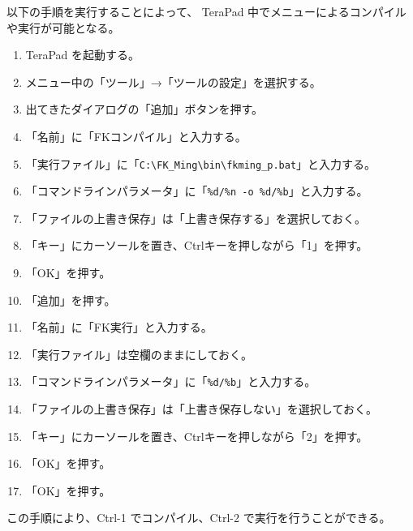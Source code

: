 \documentclass[a4paper]{jsarticle}
\begin{document}
以下の手順を実行することによって、
TeraPad 中でメニューによるコンパイルや実行が可能となる。

\begin{enumerate}

\item TeraPad を起動する。

\item メニュー中の「ツール」→「ツールの設定」を選択する。

\item 出てきたダイアログの「追加」ボタンを押す。

\item 「名前」に「FKコンパイル」と入力する。

\item 「実行ファイル」に「\verb+C:\FK_Ming\bin\fkming_p.bat+」と入力する。

\item 「コマンドラインパラメータ」に「\verb+%d/%n -o %d/%b+」と入力する。

\item 「ファイルの上書き保存」は「上書き保存する」を選択しておく。

\item 「キー」にカーソールを置き、Ctrlキーを押しながら「1」を押す。

\item 「OK」を押す。

\item 「追加」を押す。

\item 「名前」に「FK実行」と入力する。

\item 「実行ファイル」は空欄のままにしておく。

\item 「コマンドラインパラメータ」に「\verb+%d/%b+」と入力する。

\item 「ファイルの上書き保存」は「上書き保存しない」を選択しておく。

\item 「キー」にカーソールを置き、Ctrlキーを押しながら「2」を押す。

\item 「OK」を押す。

\item 「OK」を押す。
\end{enumerate}
この手順により、Ctrl-1 でコンパイル、Ctrl-2 で実行を行うことができる。
\end{document}
